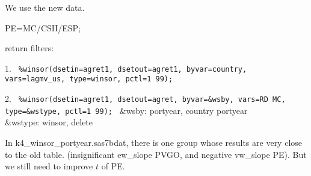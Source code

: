 

\usepackage[T1]{fontenc}




\thispagestyle{fancy}

\newcommand{\code}{\texttt}
\newcommand*{\Commonpath}{20190409}

We use the new data.

PE=MC/CSH/ESP;

return filters:

1. \code{
\%winsor(dsetin=agret1, dsetout=agret1, byvar=country, vars=lagmv\_us, type=winsor, pctl=1 99);
}

2. \code{
\%winsor(dsetin=agret1, dsetout=agret, byvar=\&wsby, vars=RD MC, type=\&wstype, pctl=1 99);
} 
\&wsby: portyear, country portyear \\
\&wstype: winsor, delete



In k4\_winsor\_portyear.sas7bdat, there is one group whose results are very close to the old table. (insignificant ew\_slope PVGO, and negative vw\_slope PE). But we still need to improve $t$ of PE.






